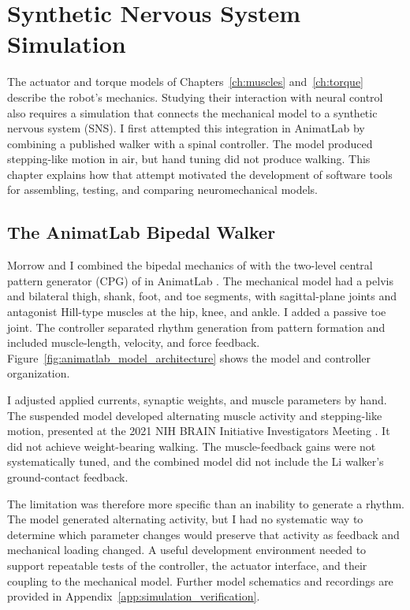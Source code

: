 \chapter{Synthetic Nervous System Simulation}\label{ch:sns}
\graphicspath{{figs/60-sns/}{figs/60-sns/AnimatLab_reference/}}

The actuator and torque models of Chapters~\ref{ch:muscles} and~\ref{ch:torque} describe the robot's mechanics. Studying their interaction with neural control also requires a simulation that connects the mechanical model to a synthetic nervous system (SNS). I first attempted this integration in AnimatLab by combining a published walker with a spinal controller. The model produced stepping-like motion in air, but hand tuning did not produce walking. This chapter explains how that attempt motivated the development of software tools for assembling, testing, and comparing neuromechanical models.

\section{The AnimatLab Bipedal Walker}\label{sec:prior_walker}

Morrow and I combined the bipedal mechanics of \citet{li_bipedal_2017} with the two-level central pattern generator (CPG) of \citet{deng_neuromechanical_2019} in AnimatLab \citep{cofer_animatlab_2010}. The mechanical model had a pelvis and bilateral thigh, shank, foot, and toe segments, with sagittal-plane joints and antagonist Hill-type muscles at the hip, knee, and ankle. I added a passive toe joint. The controller separated rhythm generation from pattern formation and included muscle-length, velocity, and force feedback. Figure~\ref{fig:animatlab_model_architecture} shows the model and controller organization.

I adjusted applied currents, synaptic weights, and muscle parameters by hand. The suspended model developed alternating muscle activity and stepping-like motion, presented at the 2021 NIH BRAIN Initiative Investigators Meeting \citep{bolenTorqueValuesArtificialKnee2021June15-17}. It did not achieve weight-bearing walking. The muscle-feedback gains were not systematically tuned, and the combined model did not include the Li walker's ground-contact feedback.

The limitation was therefore more specific than an inability to generate a rhythm. The model generated alternating activity, but I had no systematic way to determine which parameter changes would preserve that activity as feedback and mechanical loading changed. A useful development environment needed to support repeatable tests of the controller, the actuator interface, and their coupling to the mechanical model. Further model schematics and recordings are provided in Appendix~\ref{app:simulation_verification}.

